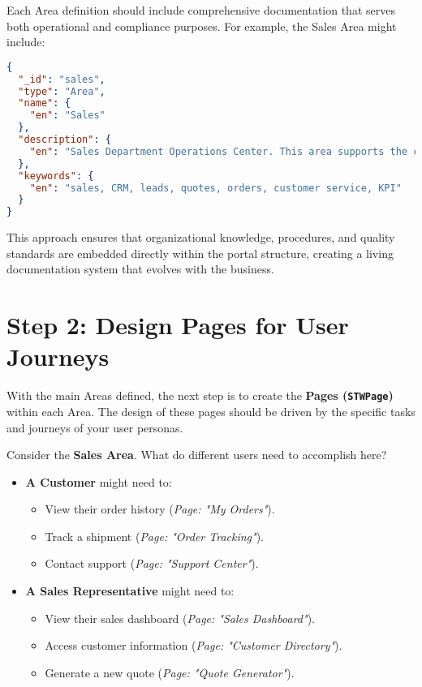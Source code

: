 Each Area definition should include comprehensive documentation that serves both operational and compliance purposes. For example, the Sales Area might include:

\begin{lstlisting}[language=JSON,caption={Sales Area with Documentation},label={lst:sales-area-docs}]
{
  "_id": "sales",
  "type": "Area",
  "name": {
    "en": "Sales"
  },
  "description": {
    "en": "Sales Department Operations Center. This area supports the complete sales lifecycle from lead generation to order fulfillment. All activities comply with our Customer Relationship Management Policy CRM-POL-001. Key Processes: Lead qualification (PROC-SALES-001), Quote generation (PROC-SALES-002), Order processing (PROC-SALES-003). Performance Targets: Response time to quotes: <24 hours, Customer satisfaction: >90%. Department Manager: Jane Smith (ext. 2001)."
  },
  "keywords": {
    "en": "sales, CRM, leads, quotes, orders, customer service, KPI"
  }
}
\end{lstlisting}

This approach ensures that organizational knowledge, procedures, and quality standards are embedded directly within the portal structure, creating a living documentation system that evolves with the business.

\section{Step 2: Design Pages for User Journeys}
\label{sec:design-pages}

With the main Areas defined, the next step is to create the \textbf{Pages (\texttt{STWPage})} within each Area. The design of these pages should be driven by the specific tasks and journeys of your user personas.

Consider the \textbf{Sales Area}. What do different users need to accomplish here?
\begin{itemize}
    \item \textbf{A Customer} might need to:
        \begin{itemize}
            \item View their order history (\textit{Page: "My Orders"}).
            \item Track a shipment (\textit{Page: "Order Tracking"}).
            \item Contact support (\textit{Page: "Support Center"}).
        \end{itemize}
    \item \textbf{A Sales Representative} might need to:
        \begin{itemize}
            \item View their sales dashboard (\textit{Page: "Sales Dashboard"}).
            \item Access customer information (\textit{Page: "Customer Directory"}).
            \item Generate a new quote (\textit{Page: "Quote Generator"}).
        \end{itemize}
\end{itemize}

